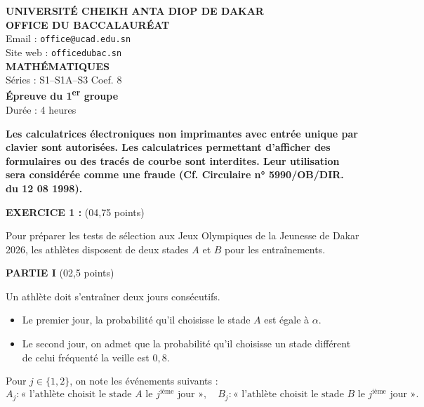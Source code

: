 \documentclass[11pt]{article}
\begin{document}
\begin{center}
    \textbf{UNIVERSITÉ CHEIKH ANTA DIOP DE DAKAR} \\
    \textbf{OFFICE DU BACCALAURÉAT} \\
    Email : \texttt{office@ucad.edu.sn} \\
    Site web : \texttt{officedubac.sn} \\
    \vspace{0.3cm}
    \textbf{\LARGE MATHÉMATIQUES} \\
    Séries : S1–S1A–S3 \hfill Coef. 8 \\
    \textbf{Épreuve du 1\textsuperscript{er} groupe} \\
    Durée : 4 heures
\end{center}

\vspace{0.2cm}
\noindent
\textbf{Les calculatrices électroniques non imprimantes avec entrée unique par clavier sont autorisées. Les calculatrices permettant d’afficher des formulaires ou des tracés de courbe sont interdites. Leur utilisation sera considérée comme une fraude (Cf. Circulaire n° 5990/OB/DIR. du 12 08 1998).}

\vspace{0.5cm}
\noindent
\textbf{EXERCICE 1 :} \hfill (04,75 points)

\vspace{0.2cm}
\noindent
Pour préparer les tests de sélection aux Jeux Olympiques de la Jeunesse de Dakar 2026, les athlètes disposent de deux stades \( A \) et \( B \) pour les entraînements.

\vspace{0.3cm}
\noindent
\textbf{PARTIE I} \hfill (02,5 points)

\vspace{0.2cm}
\noindent
Un athlète doit s’entraîner deux jours consécutifs.

\begin{itemize}
    \item Le premier jour, la probabilité qu’il choisisse le stade \( A \) est égale à \( \alpha \).
    \item Le second jour, on admet que la probabilité qu’il choisisse un stade différent de celui fréquenté la veille est \( 0{,}8 \).
\end{itemize}

\noindent
Pour \( j \in \{1,2\} \), on note les événements suivants :
\[
A_j : \text{« l’athlète choisit le stade } A \text{ le } j^\text{ième} \text{ jour »}, \quad
B_j : \text{« l’athlète choisit le stade } B \text{ le } j^\text{ième} \text{ jour »}.
\]
\end{document}
